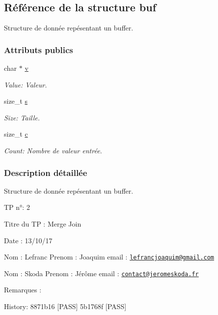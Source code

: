 \hypertarget{structbuf}{}\subsection{Référence de la structure buf}
\label{structbuf}


Structure de donnée repésentant un buffer.  


\subsubsection*{Attributs publics}
\begin{DoxyCompactItemize}
\item 
char $\ast$ \hyperlink{structbuf_a0690d33ca270683cb07fd9a1b9f4dd68}{v}
\begin{DoxyCompactList}\small\item\em Value\+: Valeur. \end{DoxyCompactList}\item 
size\+\_\+t \hyperlink{structbuf_aae0f7f61347b29fa0088cbf7d952b14c}{s}
\begin{DoxyCompactList}\small\item\em Size\+: Taille. \end{DoxyCompactList}\item 
size\+\_\+t \hyperlink{structbuf_a37cf76bb775bf17b3e7566e0611428e6}{c}
\begin{DoxyCompactList}\small\item\em Count\+: Nombre de valeur entrée. \end{DoxyCompactList}\end{DoxyCompactItemize}


\subsubsection{Description détaillée}
Structure de donnée repésentant un buffer. 

TP n°\+: 2

Titre du TP \+: Merge Join

Date \+: 13/10/17

Nom \+: Lefranc Prenom \+: Joaquim email \+: \href{mailto:lefrancjoaquim@gmail.com}{\tt lefrancjoaquim@gmail.\+com}

Nom \+: Skoda Prenom \+: Jérôme email \+: \href{mailto:contact@jeromeskoda.fr}{\tt contact@jeromeskoda.\+fr}

Remarques \+:

History\+: 8871b16 \mbox{[}P\+A\+SS\mbox{]} 5b1768f \mbox{[}P\+A\+SS\mbox{]} 

